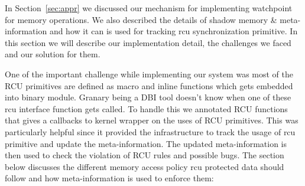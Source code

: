 In Section~\ref{sec:appr} we discussed our mechanism for implementing watchpoint for memory operations. We also described the details of shadow memory \& meta-information and how it can is used for tracking rcu synchronization primitive. In this section we will describe our implementation detail, the challenges we faced and our solution for them.

One of the important challenge while implementing our system was most of the RCU primitives are defined as macro and inline functions which gets embedded into binary module. Granary being a DBI tool doesn’t know when one of these rcu interface function gets called. To handle this we annotated RCU functions that gives a callbacks to kernel wrapper on the uses of RCU primitives. This was particularly helpful since it provided the infrastructure to track the usage of rcu primitive and update the meta-information. The updated meta-information is then used to check the violation of RCU rules and possible bugs. The section below discusses the different memory access policy rcu protected data should follow and how meta-information is used to enforce them: 

